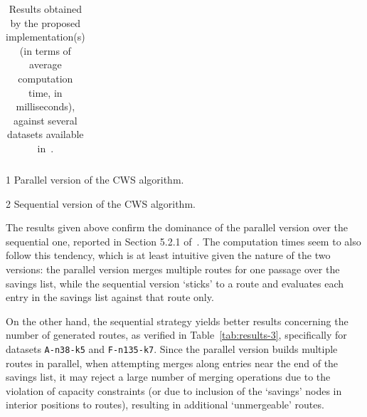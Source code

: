 \begin{table}[h!]
\begin{threeparttable}
\begin{tabularx}{0.40\textwidth}{ X X X }
        \end{tabularx}
        \begin{tablenotes}
            \footnotesize
            \item[1]Parallel version of the CWS algorithm.
            \item[2]Sequential version of the CWS algorithm.
        \end{tablenotes}
    \caption{Results obtained by the proposed implementation(s) (in terms of 
            average computation time, in milliseconds), against several datasets 
            available in~\cite{website:cvrp-datasets}.}
    \label{tab:results-2}
    \end{threeparttable}
\end{table}

The results given above confirm the dominance of the parallel version over the 
sequential one, reported in Section 5.2.1 of~\cite{Toth2002}. The computation 
times seem to also follow this tendency, which is at least intuitive given the 
nature of the two versions: the parallel version merges multiple routes for 
one passage over the savings list, while the sequential version `sticks' to a 
route and evaluates each entry in the savings list against that route 
only.\vertbreak 

On the other hand, the sequential strategy yields better results concerning the 
number of generated routes, as verified in Table~\ref{tab:results-3}, 
specifically for datasets \verb?A-n38-k5? and \verb?F-n135-k7?. Since the 
parallel version builds multiple routes in parallel, when attempting merges 
along entries near the end of the savings list, it may reject a large number 
of merging operations due to the violation of capacity constraints (or due to 
inclusion of the `savings' nodes in interior positions to routes), resulting 
in additional `unmergeable' routes.\vertbreak

